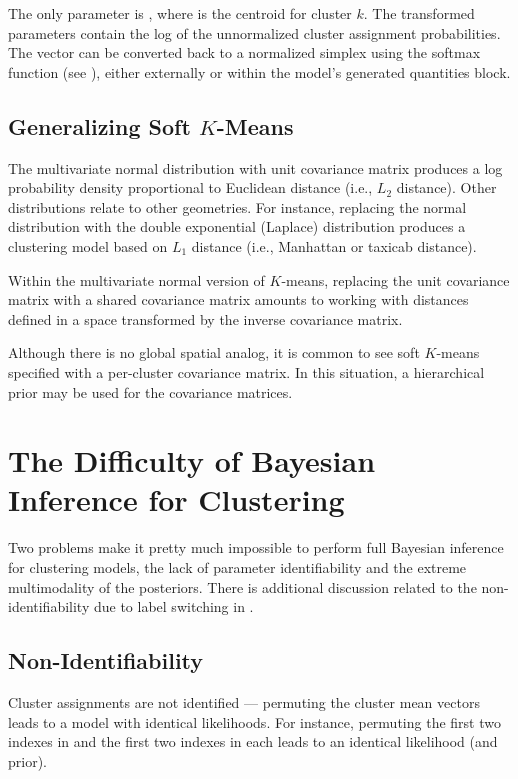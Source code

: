 The only parameter is , where  is the centroid
for cluster $k$.  The transformed parameters  contain
the log of the unnormalized cluster assignment probabilities.  The
vector  can be converted back to a normalized simplex
using the softmax function (see ), either
externally or within the model's generated quantities block.

\subsection{Generalizing Soft $K$-Means}

The multivariate normal distribution with unit covariance matrix
produces a log probability density proportional to Euclidean distance
(i.e., $L_2$ distance).  Other distributions relate to other
geometries.  For instance, replacing the normal distribution with the
double exponential (Laplace) distribution produces a clustering model
based on $L_1$ distance (i.e., Manhattan or taxicab
distance). 

Within the multivariate normal version of $K$-means, replacing the
unit covariance matrix with a shared covariance matrix amounts to
working with distances defined in a space transformed by the inverse
covariance matrix.

Although there is no global spatial analog, it is common to see soft
$K$-means specified with a per-cluster covariance matrix. In this
situation, a hierarchical prior may be used for the covariance matrices.



\section{The Difficulty of Bayesian Inference for Clustering}

Two problems make it pretty much impossible to perform full Bayesian
inference for clustering models, the lack of parameter identifiability
and the extreme multimodality of the posteriors.  There is additional
discussion related to the non-identifiability due to label switching
in .

\subsection{Non-Identifiability}

Cluster assignments are not identified --- permuting the cluster mean
vectors  leads to a model with identical likelihoods.  For
instance, permuting the first two indexes in  and the first
two indexes in each  leads to an identical likelihood
(and prior).

